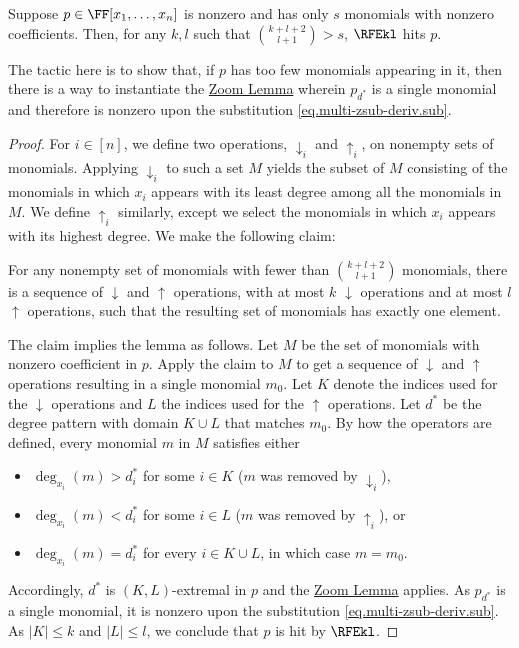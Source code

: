 \documentclass{toc}
\begin{document}
\begin{lemma}
  \label{lem.rfe-hits-sparse}
  Suppose \(p \in \FF[x_1,\ldots,x_n]\)
  is nonzero and has only \(s\) monomials with nonzero coefficients.
  Then, for any \(k,l\) such that \(\binom{k+l+2}{l+1} > s\),
  \(\RFEkl\) hits \(p\).
\end{lemma}
\noindent
The tactic here is to show that,
if \(p\) has too few monomials appearing in it,
then there is a way to instantiate the \hyperref[lem.multi-zsub-deriv]{Zoom Lemma}
wherein \(p_{d^*}\) is a single monomial
and therefore is nonzero upon the substitution \eqref{eq.multi-zsub-deriv.sub}.
\begin{proof}
  For \(i\in [n]\), we define two operations,
  \(\downarrow_i\) and \(\uparrow_i\),
  on nonempty sets of monomials.
  Applying $\downarrow_i$ to such a set \({M}\) yields the subset of \({M}\) consisting of the monomials in which
  \(x_i\) appears with its least degree among all the monomials in
  \({M}\).
  We define \(\uparrow_i\) similarly,
  except we select the monomials in which \(x_i\) appears with its highest
  degree.
  We make the following claim:

  \begin{claim}
    \label{claim.lem.rfe-hits-sparse}
    For any nonempty set of monomials with fewer than
    \(\binom{k+l+2}{l+1}\) monomials,
    there is a sequence of \(\downarrow\) and \(\uparrow\) operations,
    with at most \(k\) \(\downarrow\) operations and at most \(l\)
    \(\uparrow\) operations,
    such that the resulting set of monomials has exactly one element.
  \end{claim}

  The claim implies the lemma as follows.
  Let \({M}\) be the set of monomials with nonzero coefficient in
  \(p\).
  Apply the claim to \({M}\) to get a sequence of \(\downarrow\)
  and \(\uparrow\) operations resulting in a single monomial
  \({m}_0\).
  Let \(K\) denote the indices used for the \(\downarrow\)
  operations and \(L\) the indices used for the \(\uparrow\)
  operations.
  Let \(d^*\) be the degree pattern with domain \(K \cup L\)
  that matches \({m}_0\).
  By how the operators are defined,
  every monomial \({m}\) in \({M}\) satisfies either
  \begin{itemize}
    \item
      \(\deg_{x_i}({m}) > d^*_i\) for some \(i\in K\)
      (\({m}\) was removed by \(\downarrow_i\)),
    \item
      \(\deg_{x_i}({m}) < d^*_i\) for some \(i\in L\)
      (\({m}\) was removed by \(\uparrow_i\)),
      or
    \item \(\deg_{x_i}({m}) = d^*_i\) for every \(i\in
      K\cup L\), in which case \({m} = {m}_0\).
  \end{itemize}
  Accordingly,
  $d^*$ is $(K,L)$-extremal in $p$ and the \hyperref[lem.multi-zsub-deriv]{Zoom Lemma} applies.
  As \(p_{d^*}\) is a single monomial,
  it is nonzero upon the substitution \eqref{eq.multi-zsub-deriv.sub}.
  As $|K|\le k$ and $|L|\le l$, we conclude that \(p\) is hit by \(\RFEkl\).


\end{proof}
\end{document}
